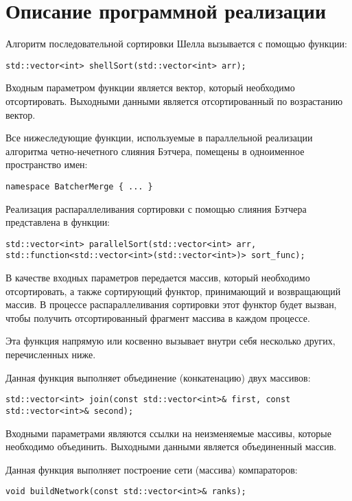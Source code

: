 \documentclass{report}
\begin{document}
\section*{Описание программной реализации}
Алгоритм последовательной сортировки Шелла вызывается с помощью функции:
\begin{lstlisting}
std::vector<int> shellSort(std::vector<int> arr);
\end{lstlisting}
\par Входным параметром функции является вектор, который необходимо отсортировать. Выходными данными является отсортированный по возрастанию вектор.
\par Все нижеследующие функции, используемые в параллельной реализации алгоритма четно-нечетного слияния Бэтчера, помещены в одноименное пространство имен:
\begin{lstlisting}
namespace BatcherMerge { ... }
\end{lstlisting}
\par Реализация распараллеливания сортировки с помощью слияния Бэтчера представлена в функции:
\begin{lstlisting}
std::vector<int> parallelSort(std::vector<int> arr, std::function<std::vector<int>(std::vector<int>)> sort_func);
\end{lstlisting}
\par В качестве входных параметров передается массив, который необходимо отсортировать, а также сортирующий функтор, принимающий и возвращающий массив. В процессе распараллеливания сортировки этот функтор будет вызван, чтобы получить отсортированный фрагмент массива в каждом процессе.
\par Эта функция напрямую или косвенно вызывает внутри себя несколько других, перечисленных ниже.
\par Данная функция выполняет объединение (конкатенацию) двух массивов:
\begin{lstlisting}
std::vector<int> join(const std::vector<int>& first, const std::vector<int>& second);
\end{lstlisting}
\par Входными параметрами являются ссылки на неизменяемые массивы, которые необходимо объединить. Выходными данными является объединенный массив.
\par Данная функция выполняет построение сети (массива) компараторов:
\begin{lstlisting}
void buildNetwork(const std::vector<int>& ranks);
\end{lstlisting}
\end{document}
